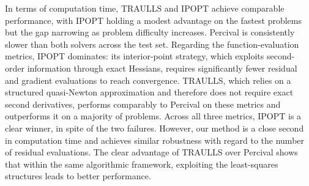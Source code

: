 In terms of computation time, TRAULLS and IPOPT achieve comparable performance, with
IPOPT holding a modest advantage on the fastest problems but the gap narrowing as
problem difficulty increases. Percival is consistently slower than both solvers across the
test set. Regarding the function-evaluation metrics, IPOPT dominates: its interior-point
strategy, which exploits second-order information through exact Hessians, requires
significantly fewer residual and gradient evaluations to reach convergence. TRAULLS, which
relies on a structured quasi-Newton approximation and therefore does not require exact
second derivatives, performs comparably to Percival on these metrics and outperforms it on
a majority of problems.
Across all three metrics, IPOPT is a clear winner, in spite of the two failures. However, our method is a close second in computation time and achieves similar robustness with regard to the number of residual evaluations. The clear advantage of TRAULLS over Percival shows that within the same algorithmic framework, exploiting the least-squares structures leads to better performance.